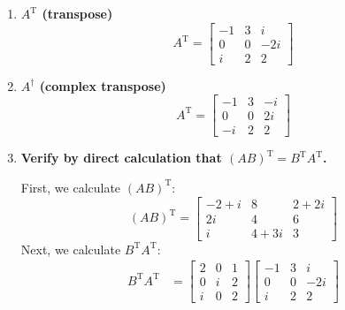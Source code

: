 \documentclass[11pt]{article}
\begin{document}
\begin{enumerate}[label=\textbf{\arabic*.}, start=4]
{\begin{enumerate}[label=\textbf{(\alph*)}]
{\begin{align*}
                        \end{align*}
                    }
                    \item{
                        \textbf{\boldmath \(A^\mathrm{T}\) (transpose)}
                        \begin{equation*}
                            A^\mathrm{T}=\begin{bmatrix}-1 & 3 & i \\ 0 & 0 & -2i \\ i & 2 & 2\end{bmatrix}
                        \end{equation*}
                    }
                    \item{
                        \textbf{\boldmath \(A^\dagger\) (complex transpose)}
                        \begin{equation*}
                            A^\mathrm{T}=\begin{bmatrix}-1 & 3 & -i \\ 0 & 0 & 2i \\ -i & 2 & 2\end{bmatrix}
                        \end{equation*}
                    }
                    \item{
                        \textbf{\boldmath Verify by direct calculation that \((AB)^\mathrm{T}=B^\mathrm{T}A^\mathrm{T}\).}
                        \par
                        First, we calculate \((AB)^\mathrm{T}\):
                        \begin{equation*}
                            (AB)^\mathrm{T}=\begin{bmatrix}-2+i & 8 & 2+2i \\ 2i & 4 & 6 \\ i & 4+3i & 3\end{bmatrix}
                        \end{equation*}
                        Next, we calculate \(B^\mathrm{T}A^\mathrm{T}\):
                        \begin{align*}
                                B^\mathrm{T}A^\mathrm{T}&=\begin{bmatrix}2 & 0 & 1 \\ 0 & i & 2 \\ i & 0 & 2\end{bmatrix}\begin{bmatrix}-1 & 3 & i \\ 0 & 0 & -2i \\ i & 2 & 2\end{bmatrix} \\

\end{align*}}
\end{enumerate}}
\end{enumerate}
\end{document}
